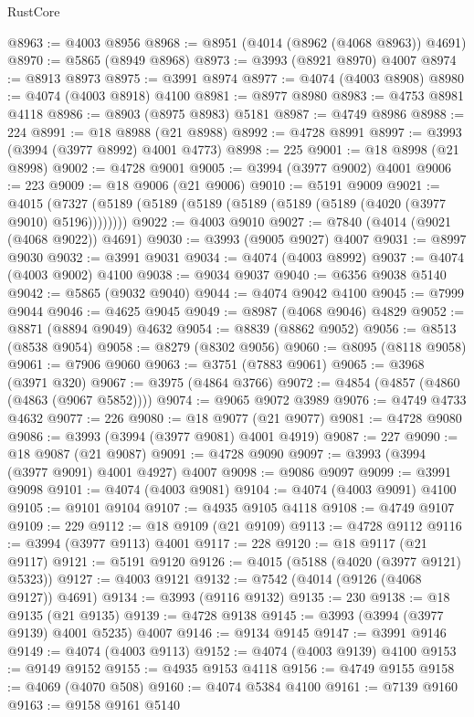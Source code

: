 \begin{lexlean}{RustCore}
\begin{coremodule}
@8963 := @4003 @8956
@8968 := @8951 (@4014 (@8962 (@4068 @8963)) @4691)
@8970 := @5865 (@8949 @8968)
@8973 := @3993 (@8921 @8970) @4007
@8974 := @8913 @8973
@8975 := @3991 @8974
@8977 := @4074 (@4003 @8908)
@8980 := @4074 (@4003 @8918) @4100
@8981 := @8977 @8980
@8983 := @4753 @8981 @4118
@8986 := @8903 (@8975 @8983) @5181
@8987 := @4749 @8986
@8988 := 224
@8991 := @18 @8988 (@21 @8988)
@8992 := @4728 @8991
@8997 := @3993 (@3994 (@3977 @8992) @4001 @4773)
@8998 := 225
@9001 := @18 @8998 (@21 @8998)
@9002 := @4728 @9001
@9005 := @3994 (@3977 @9002) @4001
@9006 := 223
@9009 := @18 @9006 (@21 @9006)
@9010 := @5191 @9009
@9021 := @4015 (@7327 (@5189 (@5189 (@5189 (@5189 (@5189 (@5189 (@4020 (@3977 @9010) @5196))))))))
@9022 := @4003 @9010
@9027 := @7840 (@4014 (@9021 (@4068 @9022)) @4691)
@9030 := @3993 (@9005 @9027) @4007
@9031 := @8997 @9030
@9032 := @3991 @9031
@9034 := @4074 (@4003 @8992)
@9037 := @4074 (@4003 @9002) @4100
@9038 := @9034 @9037
@9040 := @6356 @9038 @5140
@9042 := @5865 (@9032 @9040)
@9044 := @4074 @9042 @4100
@9045 := @7999 @9044
@9046 := @4625 @9045
@9049 := @8987 (@4068 @9046) @4829
@9052 := @8871 (@8894 @9049) @4632
@9054 := @8839 (@8862 @9052)
@9056 := @8513 (@8538 @9054)
@9058 := @8279 (@8302 @9056)
@9060 := @8095 (@8118 @9058)
@9061 := @7906 @9060
@9063 := @3751 (@7883 @9061)
@9065 := @3968 (@3971 @320)
@9067 := @3975 (@4864 @3766)
@9072 := @4854 (@4857 (@4860 (@4863 (@9067 @5852))))
@9074 := @9065 @9072 @3989
@9076 := @4749 @4733 @4632
@9077 := 226
@9080 := @18 @9077 (@21 @9077)
@9081 := @4728 @9080
@9086 := @3993 (@3994 (@3977 @9081) @4001 @4919)
@9087 := 227
@9090 := @18 @9087 (@21 @9087)
@9091 := @4728 @9090
@9097 := @3993 (@3994 (@3977 @9091) @4001 @4927) @4007
@9098 := @9086 @9097
@9099 := @3991 @9098
@9101 := @4074 (@4003 @9081)
@9104 := @4074 (@4003 @9091) @4100
@9105 := @9101 @9104
@9107 := @4935 @9105 @4118
@9108 := @4749 @9107
@9109 := 229
@9112 := @18 @9109 (@21 @9109)
@9113 := @4728 @9112
@9116 := @3994 (@3977 @9113) @4001
@9117 := 228
@9120 := @18 @9117 (@21 @9117)
@9121 := @5191 @9120
@9126 := @4015 (@5188 (@4020 (@3977 @9121) @5323))
@9127 := @4003 @9121
@9132 := @7542 (@4014 (@9126 (@4068 @9127)) @4691)
@9134 := @3993 (@9116 @9132)
@9135 := 230
@9138 := @18 @9135 (@21 @9135)
@9139 := @4728 @9138
@9145 := @3993 (@3994 (@3977 @9139) @4001 @5235) @4007
@9146 := @9134 @9145
@9147 := @3991 @9146
@9149 := @4074 (@4003 @9113)
@9152 := @4074 (@4003 @9139) @4100
@9153 := @9149 @9152
@9155 := @4935 @9153 @4118
@9156 := @4749 @9155
@9158 := @4069 (@4070 @508)
@9160 := @4074 @5384 @4100
@9161 := @7139 @9160
@9163 := @9158 @9161 @5140

\end{coremodule}
\end{lexlean}
